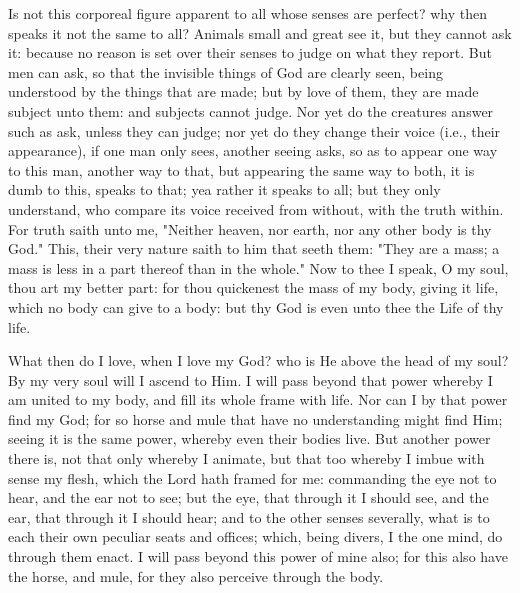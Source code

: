 \documentclass[b5paper,openright,12pt,twoside]{book}
\begin{document}
Is not this corporeal figure apparent to all whose senses are perfect?
why then speaks it not the same to all? Animals small and great see it,
but they cannot ask it: because no reason is set over their senses to
judge on what they report. But men can ask, so that the invisible things
of God are clearly seen, being understood by the things that are made;
but by love of them, they are made subject unto them: and subjects
cannot judge. Nor yet do the creatures answer such as ask, unless they
can judge; nor yet do they change their voice (i.e., their appearance),
if one man only sees, another seeing asks, so as to appear one way to
this man, another way to that, but appearing the same way to both, it is
dumb to this, speaks to that; yea rather it speaks to all; but they only
understand, who compare its voice received from without, with the truth
within. For truth saith unto me, "Neither heaven, nor earth, nor any
other body is thy God." This, their very nature saith to him that seeth
them: "They are a mass; a mass is less in a part thereof than in the
whole." Now to thee I speak, O my soul, thou art my better part: for
thou quickenest the mass of my body, giving it life, which no body can
give to a body: but thy God is even unto thee the Life of thy life.

What then do I love, when I love my God? who is He above the head of
my soul? By my very soul will I ascend to Him. I will pass beyond that
power whereby I am united to my body, and fill its whole frame with
life. Nor can I by that power find my God; for so horse and mule that
have no understanding might find Him; seeing it is the same power,
whereby even their bodies live. But another power there is, not that
only whereby I animate, but that too whereby I imbue with sense my
flesh, which the Lord hath framed for me: commanding the eye not to
hear, and the ear not to see; but the eye, that through it I should
see, and the ear, that through it I should hear; and to the other senses
severally, what is to each their own peculiar seats and offices; which,
being divers, I the one mind, do through them enact. I will pass beyond
this power of mine also; for this also have the horse, and mule, for
they also perceive through the body.
\end{document}
